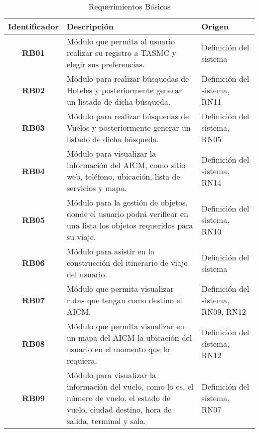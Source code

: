\begin{table}
	\begin{center}
		\begin{tabular}{|c|p{8.4cm}|p{2.5cm}|}
			\hline \rowcolor[RGB]{51,153,255} 
				\textcolor{blanco}{\bf Identificador} &
				\textcolor{blanco}{\bf Descripción} &
				\textcolor{blanco}{\bf Origen} \\
			\hline 
				\textbf{RB01} &
				Módulo que permita al usuario realizar su registro a TASMC y elegir sus preferencias. &
				Definición del sistema  \\
      		\hline \rowcolor[RGB]{240,248,255}
      			\textbf{RB02} &
				Módulo para realizar búsquedas de Hoteles y posteriormente generar un listado de dicha búsqueda. &
				Definición del sistema, RN11 \\
			\hline 
				\textbf{RB03} &
				Módulo para realizar búsquedas de Vuelos y posteriormente generar un listado de dicha búsqueda. &
				Definición del sistema, RN05 \\ 
			\hline \rowcolor[RGB]{240,248,255}
				\textbf{RB04} &
				Módulo para visualizar la información del AICM, como sitio web, teléfono, ubicación, lista de servicios y mapa. &
				Definición del sistema, RN14 \\ 
			\hline 
				\textbf{RB05} &
				Módulo para la gestión de objetos, donde el usuario podrá verificar en una lista los objetos requeridos para su viaje. &
				Definición del sistema, RN10 \\ 
			\hline \rowcolor[RGB]{240,248,255}
				\textbf{RB06} &
				Módulo para asistir en la construcción del itinerario de viaje del usuario. &
				Definición del sistema \\ 
			\hline 
				\textbf{RB07} &
				Módulo que permita visualizar rutas que tengan como destino el AICM. &
				Definición del sistema, RN09, RN12 \\ 
			\hline \rowcolor[RGB]{240,248,255}
				\textbf{RB08} &
				Módulo que permita visualizar en un mapa del AICM la ubicación del usuario en el momento que lo requiera. &
				Definición del sistema, RN12 \\ 
			\hline 
				\textbf{RB09} &
				Módulo para visualizar la información del vuelo, como lo es, el número de vuelo, el estado de vuelo, ciudad destino, hora de salida, terminal y sala. &
				Definición del sistema, RN07 \\ 
			\hline 
		\end{tabular}
	\end{center}
	\caption[Requerimientos Básicos]{Requerimientos Básicos} 
	\label{tab:reqBasicos}
\end{table}
\clearpage
\newpage
